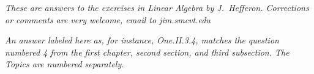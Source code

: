 \documentclass[twoside]{book}
\begin{document}

\setcounter{page}{1} 
\thispagestyle{empty}
\textit{These are answers to the exercises in \emph{Linear Algebra} by
    J.~Hef{}feron.
    Corrections or comments are very welcome, email to
    jim\@joshua.smcvt.edu}

\textit{An answer labeled here as, for instance,
   One.II.3.4, matches the question numbered 4 
   from the first chapter,
   second section, and third subsection.
   The Topics are numbered separately.}
\vspace{.25in}
\setcounter{page}{1}
\thispagestyle{empty}
\begin{answerlist}\item[]%
\clearemptydoublepage\tableofcontents

\end{answerlist}
\end{document}
